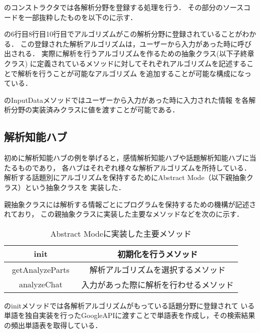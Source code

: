のコンストラクタでは各解析分野を登録する処理を行う．
その部分のソースコードを一部抜粋したものを以下のに示す．


の6行目8行目10行目でアルゴリズムがこの解析分野に登録されていることがわかる．
この登録された解析アルゴリズムは，ユーザーから入力があった時に呼び出される．
実際に解析を行うアルゴリズムを作るための抽象クラス(以下子終章クラス)
に定義されているメソッドに対してそれぞれアルゴリズムを記述することで解析を行うことが可能なアルゴリズム
を追加することが可能な構成になっている．


のInputDataメソッドではユーザーから入力があった時に入力された情報
を各解析分野の実装済みクラスに値を渡すことが可能である．


\subsection{解析知能ハブ}
初めに解析知能ハブの例を挙げると，感情解析知能ハブや話題解析知能ハブに当たるものであり，
各ハブはそれぞれ様々な解析アルゴリズムを所持している．
解析する話題別にアルゴリズムを保持するためにAbstract Mode（以下親抽象クラス）という抽象クラスを
実装した．

親抽象クラスには解析する情報ごとにプログラムを保持するための機構が記述されており，
この親抽象クラスに実装した主要なメソッドなどを次のに示す．

\begin{table}[tbh]
	\caption{Abstract Modeに実装した主要メソッド} \label{tab:Abstract Mode}
	\begin{center}
		\begin{tabular}[htb]{c|c}
		\hline
		init & 初期化を行うメソッド \\ \hline
		getAnalyzeParts　& 解析アルゴリズムを選択するメソッド \\ \hline
		analyzeChat & 入力があった際に解析を行わせるメソッド \\ \hline
		\end{tabular}
	\end{center}
\end{table}


のinitメソッドでは各解析アルゴリズムがもっている話題分野に登録されて
いる単語を独自実装を行ったGoogleAPIに渡すことで単語表を作成し，その検索結果の頻出単語表を取得している．


